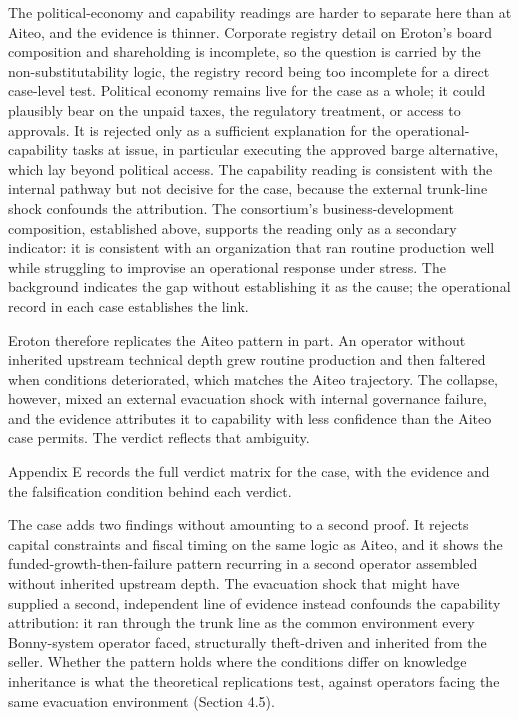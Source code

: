 \documentclass[twoside,fontset=lmodern]{mitthesis}
\begin{document}
The political-economy and capability readings are harder to separate
here than at Aiteo, and the evidence is thinner. Corporate registry
detail on Eroton's board composition and shareholding is incomplete, so
the question is carried by the non-substitutability logic, the registry
record being too incomplete for a direct case-level test. Political
economy remains live for the case as a whole; it could plausibly bear on
the unpaid taxes, the regulatory treatment, or access to approvals. It
is rejected only as a sufficient explanation for the
operational-capability tasks at issue, in particular executing the
approved barge alternative, which lay beyond political access. The
capability reading is consistent with the internal pathway but not
decisive for the case, because the external trunk-line shock confounds
the attribution. The consortium's business-development composition,
established above, supports the reading only as a secondary indicator:
it is consistent with an organization that ran routine production well
while struggling to improvise an operational response under stress. The
background indicates the gap without establishing it as the cause; the
operational record in each case establishes the link.

Eroton therefore replicates the Aiteo pattern in part. An operator
without inherited upstream technical depth grew routine production and
then faltered when conditions deteriorated, which matches the Aiteo
trajectory. The collapse, however, mixed an external evacuation shock
with internal governance failure, and the evidence attributes it to
capability with less confidence than the Aiteo case permits. The verdict
reflects that ambiguity.

Appendix E records the full verdict matrix for the case, with the
evidence and the falsification condition behind each verdict.

The case adds two findings without amounting to a second proof. It
rejects capital constraints and fiscal timing on the same logic as
Aiteo, and it shows the funded-growth-then-failure pattern recurring in
a second operator assembled without inherited upstream depth. The
evacuation shock that might have supplied a second, independent line of
evidence instead confounds the capability attribution: it ran through
the trunk line as the common environment every Bonny-system operator
faced, structurally theft-driven and inherited from the seller. Whether
the pattern holds where the conditions differ on knowledge inheritance
is what the theoretical replications test, against operators facing the
same evacuation environment (Section 4.5).
\end{document}
